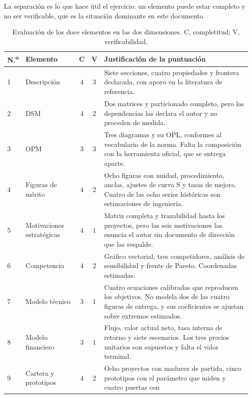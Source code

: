 \documentclass[11pt,letterpaper]{article}
\begin{document}
La separación es lo que hace útil el ejercicio: un elemento puede estar
completo y no ser verificable, que es la situación dominante en este
documento.

\begin{table}[htbp]
  \centering
  \footnotesize
  \setlength{\tabcolsep}{4pt}
  \caption{Evaluación de los doce elementos en las dos dimensiones. C,
  completitud; V, verificabilidad.}
  \label{tab:madurez}
  \begin{tabularx}{\textwidth}{@{}llcc>{\raggedright\arraybackslash}X@{}}
    \toprule
    \textbf{N.\textsuperscript{o}} & \textbf{Elemento} & \textbf{C} &
      \textbf{V} & \textbf{Justificación de la puntuación} \\
    \midrule
    1 & Descripción & 4 & 3 & Siete secciones, cuatro propiedades y frontera
      declarada, con apoyo en la literatura de referencia. \\
    2 & DSM & 4 & 2 & Dos matrices y particionado completo, pero las
      dependencias las declara el autor y no proceden de medida. \\
    3 & OPM & 3 & 3 & Tres diagramas y su OPL, conformes al vocabulario de la
      norma. Falta la composición con la herramienta oficial, que se entrega
      aparte. \\
    4 & Figuras de mérito & 4 & 2 & Ocho figuras con unidad, procedimiento,
      anclas, ajustes de curva S y tasas de mejora. Cuatro de las ocho series
      históricas son estimaciones de ingeniería. \\
    5 & Motivaciones estratégicas & 4 & 1 & Matriz completa y trazabilidad
      hasta los proyectos, pero las seis motivaciones las enuncia el autor sin
      documento de dirección que las respalde. \\
    6 & Competencia & 4 & 2 & Gráfico vectorial, tres competidores, análisis
      de sensibilidad y frente de Pareto. Coordenadas estimadas. \\
    7 & Modelo técnico & 3 & 1 & Cuatro ecuaciones calibradas que reproducen
      los objetivos. No modela dos de las cuatro figuras de entrega, y sus
      coeficientes se ajustan sobre extremos estimados. \\
    8 & Modelo financiero & 3 & 1 & Flujo, valor actual neto, tasa interna de
      retorno y siete escenarios. Los tres precios unitarios son supuestos y
      falta el valor terminal. \\
    9 & Cartera y prototipos & 4 & 2 & Ocho proyectos con madurez de partida,
      cinco prototipos con el parámetro que miden y cuatro puertas con

\end{tabularx}
\end{table}
\end{document}
